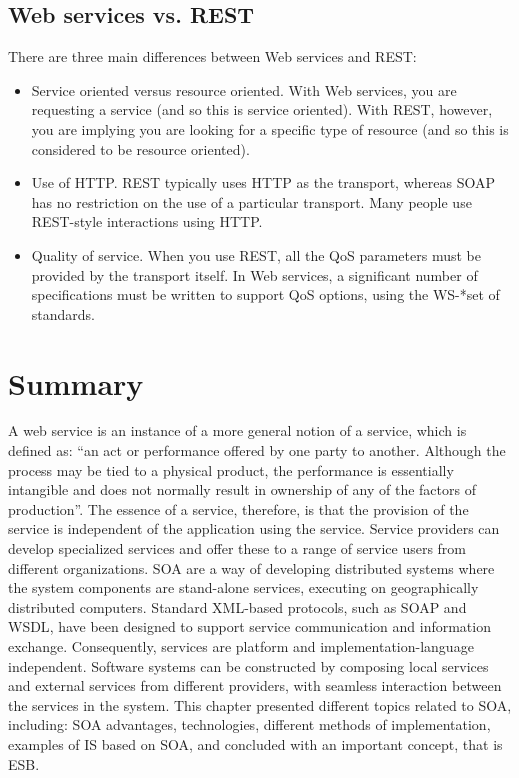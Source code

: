 \documentclass[12pt,a4paper,final,twoside,onecolumn,titlepage]{book}
\begin{document}
\subsection{Web services vs. REST}
There are three main differences between Web services and REST:
\begin{itemize}
\item Service oriented versus resource oriented. With Web services, you are requesting a service (and so this is service oriented). With REST, however, you are implying you are looking for a specific type of resource (and so this is considered to be resource oriented).
\item Use of \gls{HTTP}. REST typically uses \gls{HTTP} as the transport, whereas \gls{SOAP} has no restriction on the use of a particular transport. Many people use REST-style interactions using \gls{HTTP}.
\item Quality of service. When you use REST, all the QoS parameters must be provided by the transport itself. In Web services, a significant number of specifications must be written to support QoS options, using the WS-*set of standards.
\end{itemize}

\section{Summary}
A web service is an instance of a more general notion of a service, which is defined as:
“an act or performance offered by one party to another. Although the process may be tied to a physical product, the performance is essentially intangible and does not normally result in ownership of any of the factors of production”. The essence of a service, therefore, is that the provision of the service is independent of the application using the service. Service providers can develop specialized services and offer these to a range of service users from different organizations. \gls{SOA} are a way of developing distributed systems where the system components are stand-alone services, executing on geographically distributed computers. Standard \gls{XML}-based protocols, such as \gls{SOAP} and \gls{WSDL}, have been designed to support service communication and information exchange. Consequently, services are platform and implementation-language independent. Software systems can be constructed by composing local services and external services from different providers, with seamless interaction between the services in the system. This chapter presented different topics related to \gls{SOA}, including: \gls{SOA} advantages, technologies, different methods of implementation, examples of \gls{IS} based on \gls{SOA}, and concluded with an important concept, that is \gls{ESB}.
\end{document}
